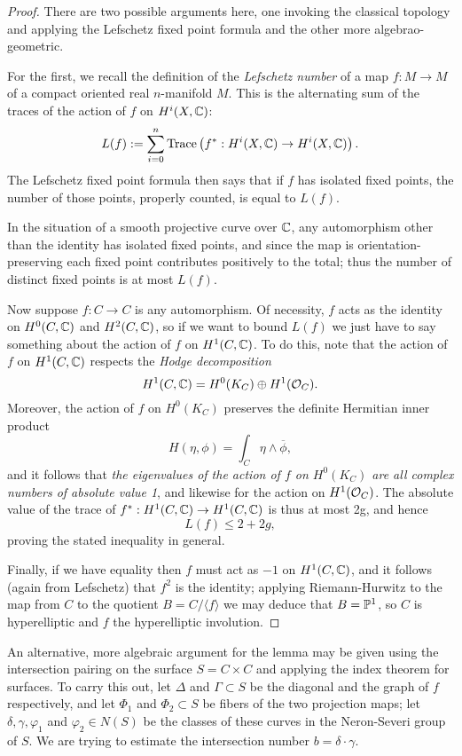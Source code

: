 \begin{proof}
There are two possible arguments here, one invoking the classical topology and applying the Lefschetz fixed point formula and the other more algebrao-geometric.

For the first, we recall the definition of the \emph{Lefschetz number} of a map $f : M \to M$ of a compact oriented real $n$-manifold $M$. This is the alternating sum of the traces of the action of $f$ on $H^i(X,{\mathbb C})$:
$$
L(f) := \sum_{i=0}^n {\rm Trace}\left(f^* : H^i(X,{\mathbb C}) \to H^i(X,{\mathbb C})\right).
$$
The Lefschetz fixed point formula then says that if $f$ has isolated fixed points, the number of those points, properly counted, is equal to $L(f)$.

In the situation of a smooth projective curve over ${\mathbb C}$, any automorphism other than the identity has isolated fixed points, and since the map is orientation-preserving each fixed point contributes positively to the total; thus the number of distinct fixed points is at most $L(f)$.

Now suppose $f: C \to C$ is any automorphism. Of necessity, $f$ acts as the identity on $H^0(C, {\mathbb C})$ and $H^2(C, {\mathbb C})$, so if we want to bound $L(f)$ we just have to say something about the action of $f$ on $H^1(C,{\mathbb C})$. To do this, note that the action of $f$ on $H^1(C,{\mathbb C})$ respects the \emph{Hodge decomposition}
$$
H^1(C,{\mathbb C})  = H^0(K_C) \oplus H^1({\mathcal O}_C).
$$  
Moreover, the action of $f$ on $H^0(K_C)$ preserves the definite Hermitian inner product
$$
H(\eta, \phi) = \int_C \eta \wedge \overline \phi,
$$
and it follows that \emph{the eigenvalues of the action of $f$ on $H^0(K_C)$ are all complex numbers of absolute value 1}, and likewise for the action on $H^1({\mathcal O}_C)$. The absolute value of the trace of $f^*: H^1(C,{\mathbb C}) \to H^1(C,{\mathbb C})$ is thus at most 2g, and hence
$$
L(f) \leq 2 + 2g,
$$
proving the stated inequality in general.

Finally, if we have equality then $f$ must act as $-1$ on $H^1(C,{\mathbb C})$, and it follows (again from Lefschetz) that $f^2$ is the identity; applying Riemann-Hurwitz to the map from $C$ to the quotient $B = C/\langle f \rangle$ we may deduce that $B = {\mathbb P}^1$, so $C$ is hyperelliptic and $f$ the hyperelliptic involution.
\end{proof}

An alternative, more algebraic argument for the lemma may be given using the intersection pairing on the surface $S = C \times C$ and applying the index theorem for surfaces. To carry this out, let $\Delta$ and $\Gamma \subset S$ be the diagonal and the graph of $f$ respectively, and let $\Phi_1$ and $\Phi_2 \subset S$ be fibers of the two projection maps; let $\delta, \gamma, \varphi_1$ and $\varphi_2 \in N(S)$ be the classes of these curves in the Neron-Severi group of $S$. We are trying to estimate the intersection number $b = \delta \cdot \gamma$.

